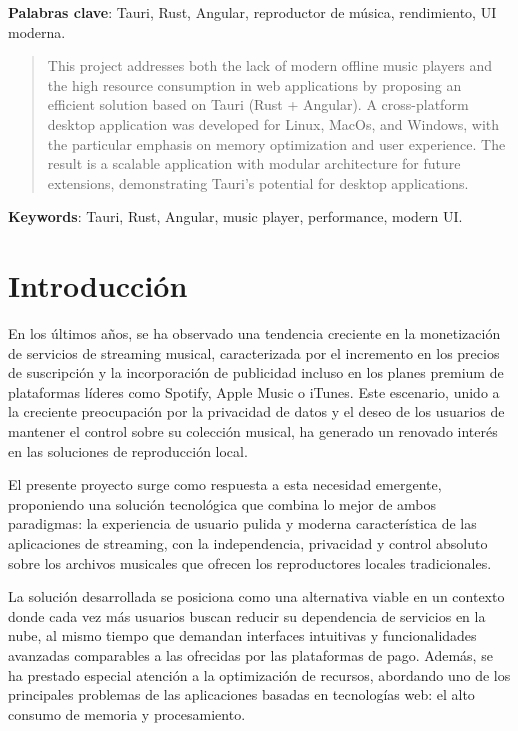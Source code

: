 \documentclass[11pt, a4paper]{article}
\begin{document}
\noindent \textbf{Palabras clave}: Tauri, Rust, Angular, reproductor de música, rendimiento, UI moderna.

\begin{abstract}
    This project addresses both the lack of modern offline music players and the high resource consumption in web applications by proposing an efficient solution based on Tauri (Rust + Angular). A cross-platform desktop application was developed for Linux, MacOs, and Windows, with the particular emphasis on memory optimization and user experience. The result is a scalable application with modular architecture for future extensions, demonstrating Tauri's potential for desktop applications.
\end{abstract}

\noindent \textbf{Keywords}: Tauri, Rust, Angular, music player, performance, modern UI.


\clearpage

\tableofcontents
\listoffigures
\listoftables
\lstlistoflistings


\clearpage


\setcounter{page}{1}
\section{Introducción}

En los últimos años, se ha observado una tendencia creciente en la monetización de servicios de streaming musical, caracterizada por el incremento en los precios de suscripción y la incorporación de publicidad incluso en los planes premium de plataformas líderes como Spotify, Apple Music o iTunes. Este escenario, unido a la creciente preocupación por la privacidad de datos y el deseo de los usuarios de mantener el control sobre su colección musical, ha generado un renovado interés en las soluciones de reproducción local. 

El presente proyecto surge como respuesta a esta necesidad emergente, proponiendo una solución tecnológica que combina lo mejor de ambos paradigmas: la experiencia de usuario pulida y moderna característica de las aplicaciones de streaming, con la independencia, privacidad y control absoluto sobre los archivos musicales que ofrecen los reproductores locales tradicionales. 

La solución desarrollada se posiciona como una alternativa viable en un contexto donde cada vez más usuarios buscan reducir su dependencia de servicios en la nube, al mismo tiempo que demandan interfaces intuitivas y funcionalidades avanzadas comparables a las ofrecidas por las plataformas de pago. Además, se ha prestado especial atención a la optimización de recursos, abordando uno de los principales problemas de las aplicaciones basadas en tecnologías web: el alto consumo de memoria y procesamiento.
\end{document}
